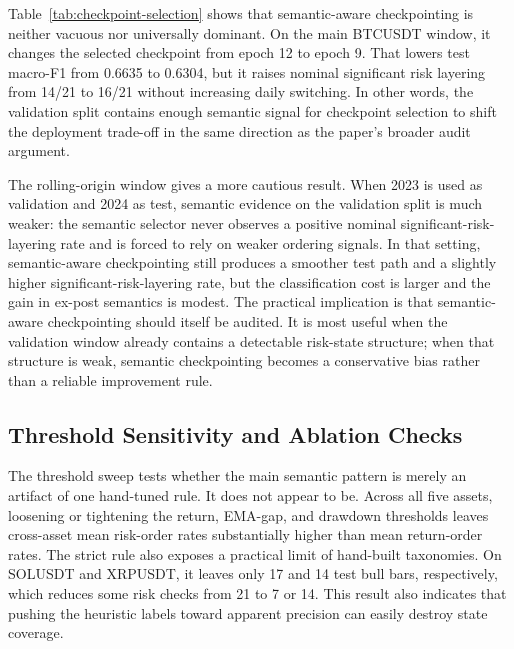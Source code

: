 \documentclass[a4paper,fleqn]{cas-dc}
\begin{document}
Table~\ref{tab:checkpoint-selection} shows that semantic-aware checkpointing is neither vacuous nor universally dominant. On the main BTCUSDT window, it changes the selected checkpoint from epoch 12 to epoch 9. That lowers test macro-F1 from 0.6635 to 0.6304, but it raises nominal significant risk layering from 14/21 to 16/21 without increasing daily switching. In other words, the validation split contains enough semantic signal for checkpoint selection to shift the deployment trade-off in the same direction as the paper's broader audit argument.

The rolling-origin window gives a more cautious result. When 2023 is used as validation and 2024 as test, semantic evidence on the validation split is much weaker: the semantic selector never observes a positive nominal significant-risk-layering rate and is forced to rely on weaker ordering signals. In that setting, semantic-aware checkpointing still produces a smoother test path and a slightly higher significant-risk-layering rate, but the classification cost is larger and the gain in ex-post semantics is modest. The practical implication is that semantic-aware checkpointing should itself be audited. It is most useful when the validation window already contains a detectable risk-state structure; when that structure is weak, semantic checkpointing becomes a conservative bias rather than a reliable improvement rule.

\subsection{Threshold Sensitivity and Ablation Checks}
The threshold sweep tests whether the main semantic pattern is merely an artifact of one hand-tuned rule. It does not appear to be. Across all five assets, loosening or tightening the return, EMA-gap, and drawdown thresholds leaves cross-asset mean risk-order rates substantially higher than mean return-order rates. The strict rule also exposes a practical limit of hand-built taxonomies. On SOLUSDT and XRPUSDT, it leaves only 17 and 14 test bull bars, respectively, which reduces some risk checks from 21 to 7 or 14. This result also indicates that pushing the heuristic labels toward apparent precision can easily destroy state coverage.
\end{document}
